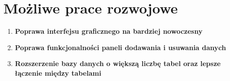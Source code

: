 \section{Możliwe prace rozwojowe}
\begin{enumerate}
    \item \textbf{Poprawa interfejsu graficznego na bardziej nowoczesny}
    \item \textbf{Poprawa funkcjonalności paneli dodawania i usuwania danych}
    \item \textbf{Rozszerzenie bazy danych o większą liczbę tabel oraz lepsze łączenie między tabelami}
\end{enumerate}
